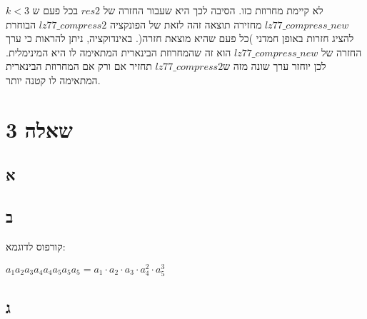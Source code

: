 \documentclass{article}
\begin{document}
לא קיימת מחרוזת כזו.
הסיבה לכך היא שעבור החזרה של $res2$ בכל פעם ש $k<3$ $lz77\_compress\_new$ מחזירה תוצאה זהה לזאת של הפונקציה $lz77\_compress2$ הבוחרת להציג חזרות באופן חמדני )כל פעם שהיא מוצאת חזרה(.
באינדוקציה, ניתן להראות כי ערך החזרה של $lz77\_compress\_new$ הוא זה שהמחרוזת הבינארית המתאימה לו היא המינימלית. לכן יוחזר ערך שונה מזה ש$lz77\_compress2$ תחזיר אם ורק אם המחרוזת הבינארית המתאימה לו קטנה יותר. 

\section*{שאלה 3}

\subsection*{א}

\begin{center}
\end{center}

\begin{center}
\end{center}

\subsection*{ב}

קורפוס לדוגמא:

$a_1 a_2 a_3 a_4 a_4 a_5 a_5 a_5 = a_1 \cdot a_2 \cdot a_3 \cdot a_4^2 \cdot a_5^3$

\subsection*{ג}
\end{document}
